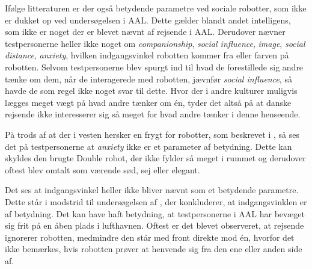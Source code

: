 %
Ifølge litteraturen er der også betydende parametre ved sociale robotter, som ikke er dukket op ved undersøgelsen i AAL. Dette gælder blandt andet intelligens, som ikke er noget der er blevet nævnt af rejsende i AAL. Derudover nævner testpersonerne heller ikke noget om \textit{companionship}, \textit{social influence}, \textit{image}, \textit{social distance}, \textit{anxiety}, hvilken indgangsvinkel robotten kommer fra eller farven på robotten. Selvom testpersonerne blev spurgt ind til hvad de forestillede sig andre tænke om dem, når de interagerede med robotten, jævnfør \textit{social influence}, så havde de som regel ikke noget svar til dette. Hvor der i andre kulturer muligvis lægges meget vægt på hvad andre tænker om én, tyder det altså på at danske rejsende ikke interesserer sig så meget for hvad andre tænker i denne henseende. 

På trods af at der i vesten hersker en frygt for robotter, som beskrevet i , så ses det på testpersonerne at \textit{anxiety} ikke er et parameter af betydning. Dette kan skyldes den brugte Double robot, der ikke fylder så meget i rummet og derudover oftest blev omtalt som værende sød, sej eller elegant. 

Det ses at indgangsvinkel heller ikke bliver nævnt som et betydende parametre. Dette står i modstrid til undersøgelsen af \textcite{PDF:HowMayIServeYou}, der konkluderer, at indgangsvinklen er af betydning. Det kan have haft betydning, at testpersonerne i AAL har bevæget sig frit på en åben plads i lufthavnen. Oftest er det blevet observeret, at rejsende ignorerer robotten, medmindre den står med front direkte mod én, hvorfor det ikke bemærkes, hvis robotten prøver at henvende sig fra den ene eller anden side af. 

%






